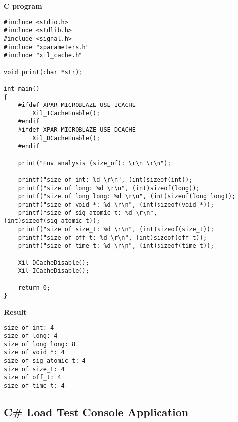 \textbf{C program}
\begin{verbatim}
#include <stdio.h>
#include <stdlib.h>
#include <signal.h>
#include "xparameters.h"
#include "xil_cache.h"

void print(char *str);

int main()
{
    #ifdef XPAR_MICROBLAZE_USE_ICACHE
        Xil_ICacheEnable();
    #endif
    #ifdef XPAR_MICROBLAZE_USE_DCACHE
        Xil_DCacheEnable();
    #endif

    print("Env analysis (size_of): \r\n \r\n");

    printf("size of int: %d \r\n", (int)sizeof(int));
    printf("size of long: %d \r\n", (int)sizeof(long));
    printf("size of long long: %d \r\n", (int)sizeof(long long));
    printf("size of void *: %d \r\n", (int)sizeof(void *));
    printf("size of sig_atomic_t: %d \r\n", (int)sizeof(sig_atomic_t));
    printf("size of size_t: %d \r\n", (int)sizeof(size_t));
    printf("size of off_t: %d \r\n", (int)sizeof(off_t));
    printf("size of time_t: %d \r\n", (int)sizeof(time_t));

    Xil_DCacheDisable();
    Xil_ICacheDisable();

    return 0;
}
\end{verbatim}

\textbf{Result}
\begin{verbatim}
size of int: 4
size of long: 4
size of long long: 8
size of void *: 4
size of sig_atomic_t: 4
size of size_t: 4
size of off_t: 4
size of time_t: 4
\end{verbatim}

\subsection{C\# Load Test Console Application}
\label{appendix:csharp-load}

